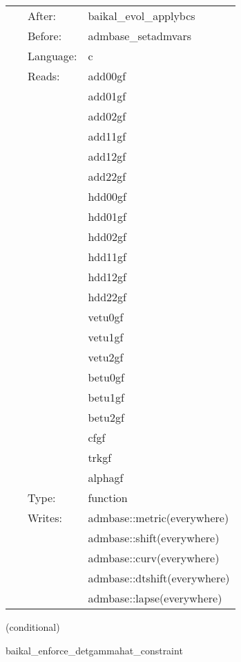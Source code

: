 \hspace{5mm}

 \begin{tabular*}{160mm}{cll} 
~ & After:  & baikal\_evol\_applybcs \\ 
~ & Before:  & admbase\_setadmvars \\ 
~ & Language:  & c \\ 
~ & Reads:  & add00gf \\ 
~& ~ &add01gf\\ 
~& ~ &add02gf\\ 
~& ~ &add11gf\\ 
~& ~ &add12gf\\ 
~& ~ &add22gf\\ 
~& ~ &hdd00gf\\ 
~& ~ &hdd01gf\\ 
~& ~ &hdd02gf\\ 
~& ~ &hdd11gf\\ 
~& ~ &hdd12gf\\ 
~& ~ &hdd22gf\\ 
~& ~ &vetu0gf\\ 
~& ~ &vetu1gf\\ 
~& ~ &vetu2gf\\ 
~& ~ &betu0gf\\ 
~& ~ &betu1gf\\ 
~& ~ &betu2gf\\ 
~& ~ &cfgf\\ 
~& ~ &trkgf\\ 
~& ~ &alphagf\\ 
~ & Type:  & function \\ 
~ & Writes:  & admbase::metric(everywhere) \\ 
~& ~ &admbase::shift(everywhere)\\ 
~& ~ &admbase::curv(everywhere)\\ 
~& ~ &admbase::dtshift(everywhere)\\ 
~& ~ &admbase::lapse(everywhere)\\ 
\end{tabular*} 


\vspace{5mm}

   (conditional) 

\hspace{5mm} baikal\_enforce\_detgammahat\_constraint 

\hspace{5mm}{\it enforce detgammabar = detgammahat (= 1 in cartesian) } 



